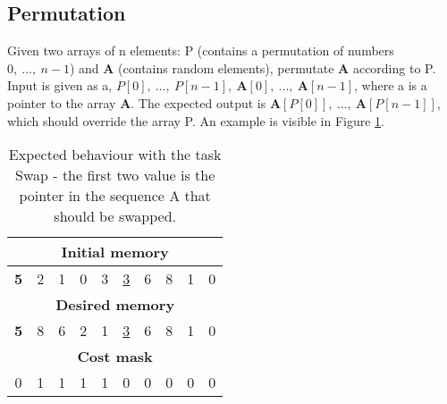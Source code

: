 \subsection{Permutation}
Given two arrays of n elements: P (contains a permutation of numbers $0,\ \dots,\ n-1$) and \textbf{A} (contains random elements), permutate \textbf{A} according to P. Input is given as a, $P[0],\ \dots,\ P[n-1],\ \textbf{A}[0],\ ...,\ \textbf{A}[n-1]$, where a is a pointer to the array \textbf{A}. The expected output is $\textbf{A}[P[0]],\ \dots,\ \textbf{A}[P[n-1]]$, which should override the array P. An example is visible in Figure \ref{fig:permutation-example}.
\begin{table}[h!]
	\centering
	\begin{tabular}{|c|c|c|c|c|c|c|c|c|c|}
		\hline
		\multicolumn{10}{|c|}{\textbf{Initial memory}} \\ \hline
		\textbf{5} & 2 & 1 & 0 & 3 & \underline{3} & 6 & 8 & 1 & 0 \\ \hline\hline\hline
		\multicolumn{10}{|c|}{\textbf{Desired memory}} \\ \hline
		\textbf{5} & 8 & 6 & 2 & 1 & \underline{3} & 6 & 8 & 1 & 0 \\ \hline\hline\hline
		\multicolumn{10}{|c|}{\textbf{Cost mask}} \\ \hline
		0 & 1 & 1 & 1 & 1 & 0 & 0 & 0 & 0 & 0 \\ \hline
	\end{tabular}
	\caption{Expected behaviour with the task Swap - the first two value is the pointer in the sequence A that should be swapped.}
	\label{fig:permutation-example}
\end{table}
\FloatBarrier


